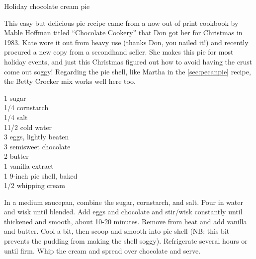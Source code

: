 \begin{entry}{Holiday chocolate cream pie}

\begin{open}
  This easy but delicious pie recipe came from a now out of print cookbook by
  Mable Hoffman titled ``Chocolate Cookery'' that Don got her for Christmas in
  1983. Kate wore it out from heavy use (thanks Don, you nailed it!) and
  recently procured a new copy from a secondhand seller. She makes this pie
  for most holiday events, and just this Christmas figured out how to avoid
  having the crust come out soggy! Regarding the pie shell, like Martha in the
  \ref{sec:pecanpie} recipe, the Betty Crocker mix works well here too.
\end{open}
\begin{ingredients}
    \SI{1}{\cup} sugar\\
    \SI{1/4}{\cup} cornstarch\\
    \SI{1/4}{\teaspoon} salt\\
    1\SI{1/2}{\cup} cold water\\
    3 eggs, lightly beaten \\
    \SI{3}{\ounce} semisweet chocolate \\
    \SI{2}{\tblspoon} butter \\
    \SI{1}{\teaspoon} vanilla extract\\
    1 9-inch pie shell, baked \\
    \SI{1/2}{\cup} whipping cream \\
\end{ingredients}
In a medium saucepan, combine the sugar, cornstarch, and salt. Pour in water
and wisk until blended. Add eggs and chocolate and stir/wisk constantly until
thickened and smooth, about 10-20 minutes. Remove from heat and add vanilla
and butter. Cool a bit, then scoop and smooth into pie shell (NB: this bit
prevents the pudding from making the shell soggy). Refrigerate several hours
or until firm. Whip the cream and spread over chocolate and serve.
\end{entry}
